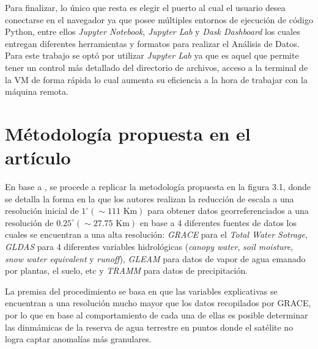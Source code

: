 Para finalizar, lo único que resta es elegir el puerto al cual el usuario desea conectarse en el navegador ya que posee múltiples entornos de ejecución de código Python, entre ellos \textit{Jupyter Notebook}, \textit{Jupyter Lab} y \textit{Dask Dashboard}
los cuales entregan diferentes herramientas y formatos para realizar el Análisis de Datos. Para este trabajo se optó por utilizar \textit{Jupyter Lab} ya que es aquel que permite tener un control más detallado del directorio de archivos, acceso a la terminal
de la VM de forma rápida lo cual aumenta su eficiencia a la hora de trabajar con la máquina remota. 
%
%
%
%
\section{Métodología propuesta en el artículo}
En base a \cite{11}, se procede a replicar la metodología propuesta en la figura 3.1, donde se detalla
la forma en la que los autores realizan la reducción de escala a una resolución inicial de $1^{\circ}(\sim 111 \text{ Km})$
para obtener datos georreferenciados a una resolución de $0.25^{\circ}(\sim 27.75 \text{ Km})$ en base a 4 diferentes fuentes de datos los cuales se encuentran a una alta resolución: 
\textit{GRACE} para el \textit{Total Water Sotrage}, \textit{GLDAS} para 4 diferentes variables hidrológicas (\textit{canopy water}, \textit{soil moisture}, 
\textit{snow water equivalent} y \textit{runoff}), \textit{GLEAM} para datos 
de vapor de agua emanado por plantas, el suelo, etc y \textit{TRAMM} para datos de precipitación.

La premisa del procedimiento se basa en que las variables explicativas se encuentran a una resolución mucho mayor que los datos recopilados por GRACE,
por lo que en base al comportamiento de cada una de ellas es posible determinar las dinmámicas de la reserva de agua terrestre en puntos donde el satélite no 
logra captar anomalías más granulares.

